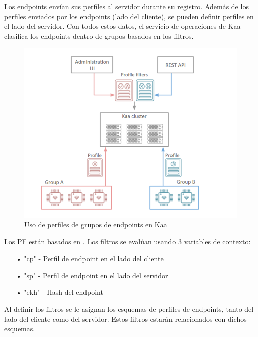 \documentclass[12pt, twoside]{book}
\newcommand{\MYhref}[3][blue]{\href{#2}{\color{#1}{#3}}}
\begin{document}
Los endpoints envían sus perfiles al servidor durante su registro.  Además de los perfiles enviados por los endpoints (lado del cliente), se pueden definir perfiles en el lado del servidor. Con todos estos datos, el servicio de operaciones de Kaa clasifica los endpoints dentro de grupos basados en los filtros. 
\begin{figure}[H]
\centering
\includegraphics[scale=0.4]{images/filters}
\caption{Uso de perfiles de grupos de endpoints en Kaa}\label{L508}
\end{figure}
Los PF están basados en \MYhref{http://docs.spring.io/spring/docs/3.0.x/reference/expressions.html}{Spring Language}. Los filtros se evalúan usando 3 variables de contexto:
\begin{itemize}
\item[•] "cp" - Perfil de endpoint en el lado del cliente
\item[•] "sp" - Perfil de endpoint en el lado del servidor
\item[•] "ekh" - Hash del endpoint 
\end{itemize}
Al definir los filtros se le asignan los esquemas de perfiles de endpoints, tanto del lado del cliente como del servidor. Estos filtros estarán relacionados con dichos esquemas.\\
\end{document}

